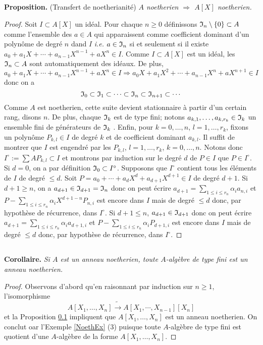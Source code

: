 \documentclass[a4paper, 12pt]{amsart}
\begin{document}
\subsection{}\label{NoethTransfert}\textbf{Proposition.} (Transfert de noetherianit\'e) \textit{$A$ noetherien $\Rightarrow$ $A[X]$ noetherien.}
\begin{proof}Soit $I\subset A[X]$ un id\'eal. Pour chaque $n\geq 0$ d\'efinissons $\frak{I}_n\setminus \lbrace 0\rbrace\subset A$ comme l'ensemble des $a\in A$ qui apparaissent comme coefficient dominant  d'un polyn\^ome de degr\'e $n$ dand $I$ \textit{i.e.} $a\in \frak{I}_n$ si et seulement si il existe $a_0+a_1X+\cdots+a_{n-1}X^{n-1}+aX^n\in I$. Comme $I\subset A[X]$ est un id\'eal, les $\frak{I}_n\subset A$ sont automatiquement des id\'eaux. De plus,  $$a_0+a_1X+\cdots+a_{n-1}X^{n-1}+aX^n\in I\Rightarrow a_0X+a_1X^2+\cdots+a_{n-1}X^{n}+aX^{n+1}\in I$$ donc on a 
$$\frak{I}_0\subset \frak{I}_1\subset \cdots\subset \frak{I}_n\subset \frak{I}_{n+1}\subset \cdots$$
Comme $A$ est noetherien, cette suite devient stationnaire \`a partir d'un certain rang, disons $n$. De plus,  chaque $\frak{I}_k$ est de type fini; notons $a_{k,1},\dots, a_{k,r_k}\in \frak{I}_k$ un ensemble fini de g\'en\'erateurs de $\frak{I}_k$ . Enfin,  pour  $k=0,\dots, n$, $l=1,\dots, r_k$, fixons un polyn\^ome $P_{k,l}\in I$ de degr\'e $k$ et de coefficient dominant $a_{k,l}$. Il suffit de montrer que $I$ est engendr\'e par les $P_{k,l}$,  $l=1,\dots, r_k$, $k=0,\dots, n$. Notons donc $I^\circ:=\sum AP_{k,l}\subset I$ et montrons par induction sur le degr\'e $d$ de $P\in I$ que $P\in I^\circ$. Si $d=0$, on a par d\'efinition $  \frak{I}_0\subset I^\circ$. Supposons que $I^\circ$ contient tous les   \'el\'ements de $I$ de degr\'e $\leq d$. Soit $P=a_0+\cdots+a_dX^d+a_{d+1}X^{d+1}\in I$ de degr\'e $d+1$. Si $d+1\geq n$, on a $a_{d+1}\in \frak{I}_{d+1}=\frak{I}_n$ donc on peut \'ecrire $a_{d+1}=\sum_{1\leq i\leq r_n}\alpha_ia_{n,i}$ et $P-\sum_{1\leq i\leq r_n}\alpha_iX^{d+1-n}P_{n,i}$ est encore dans $I$ mais de degr\'e $\leq d$ donc, par hypoth\`ese de r\'ecurrence, dans $I^\circ$. Si $d+1\leq n$, $a_{d+1}\in \frak{I}_{d+1}$ donc on peut \'ecrire $a_{d+1}=\sum_{1\leq i\leq r_n}\alpha_ia_{d+1,i}$ et $P-\sum_{1\leq i\leq r_n}\alpha_i P_{d+1,i}$ est encore dans $I$ mais de degr\'e $\leq d$ donc, par hypoth\`ese de r\'ecurrence, dans $I^\circ$. 
\end{proof}


\subsection{}\label{NoethTransfertCor}\textbf{Corollaire.} \textit{Si $A$ est un anneau noetherien, toute $A$-alg\`ebre de type fini est un anneau noetherien.}
\begin{proof} Observons d'abord qu'en raisonnant par induction sur $n\geq 1$,   l'isomorphisme $$A[X_1,\dots, X_n]\tilde{\rightarrow} A[X_1,\cdots,X_{n-1}] [X_n]$$ et la Proposition \ref{NoethTransfert} impliquent que $A[X_1,\dots, X_n]$ est un anneau noetherien. On conclut oar l'Exemple \ref{NoethEx} (3) puisque toute $A$-alg\`ebre de type fini  est quotient d'une $A$-alg\`ebre de la forme $A[X_1,\dots, X_n]$. \end{proof}
\end{document}
